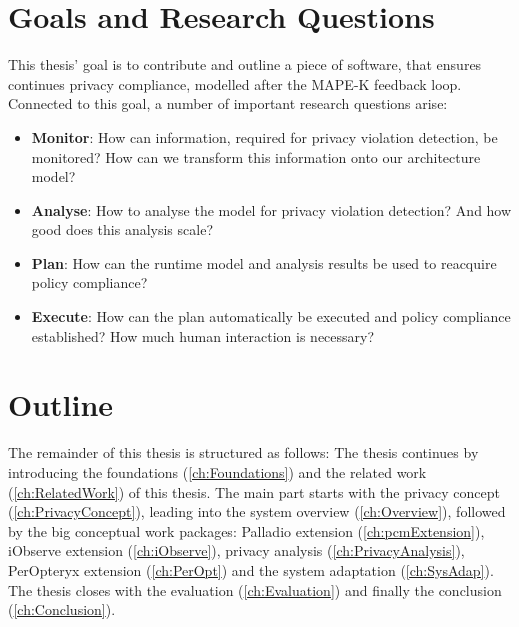 %
%


\section{Goals and Research Questions}
\label{sec:Introduction:goals}

This thesis' goal is to contribute and outline a piece of software, that ensures continues privacy compliance, modelled after the MAPE-K feedback loop. Connected to this goal, a number of important research questions arise:

\begin{itemize}
	\setlength\itemsep{0em}
	\item \textbf{Monitor}: How can information, required for privacy violation detection, be monitored? How can we transform this information onto our architecture model?
	\item \textbf{Analyse}: How to analyse the model for privacy violation detection? And how good does this analysis scale?
	\item \textbf{Plan}: How can the runtime model and analysis results be used to reacquire policy compliance?
	\item \textbf{Execute}: How can the plan automatically be executed and policy compliance established? How much human interaction is necessary?
\end{itemize}



\section{Outline}
\label{sec:Introduction:outline}

The remainder of this thesis is structured as follows: The thesis continues by introducing the foundations (\autoref{ch:Foundations}) and the related work (\autoref{ch:RelatedWork}) of this thesis. The main part starts with the privacy concept (\autoref{ch:PrivacyConcept}), leading into the system overview (\autoref{ch:Overview}), followed by the big conceptual work packages: Palladio extension (\autoref{ch:pcmExtension}), iObserve extension (\autoref{ch:iObserve}), privacy analysis (\autoref{ch:PrivacyAnalysis}), PerOpteryx extension (\autoref{ch:PerOpt}) and the system adaptation (\autoref{ch:SysAdap}). The thesis closes with the evaluation (\autoref{ch:Evaluation}) and finally the conclusion (\autoref{ch:Conclusion}).



